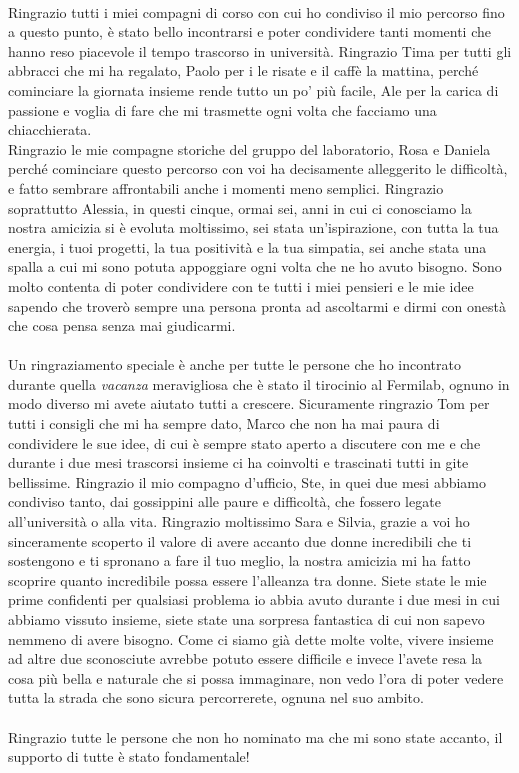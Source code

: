 \paragraph{}
Ringrazio tutti i miei compagni di corso con cui ho condiviso il mio percorso fino a questo punto, è stato bello incontrarsi e poter condividere tanti momenti che hanno reso piacevole il tempo trascorso in università.
Ringrazio Tima per tutti gli abbracci che mi ha regalato, Paolo per i le risate e il caffè la mattina, perché cominciare la giornata insieme rende tutto un po' più facile, Ale per la carica di passione e voglia di fare che mi trasmette ogni volta che facciamo una chiacchierata.\\
Ringrazio le mie compagne storiche del gruppo del laboratorio, Rosa e Daniela perché cominciare questo percorso con voi ha decisamente alleggerito le difficoltà, e fatto sembrare affrontabili anche i momenti meno semplici. 
Ringrazio soprattutto Alessia, in questi cinque, ormai sei, anni in cui ci conosciamo la nostra amicizia si è evoluta moltissimo, sei stata un'ispirazione, con tutta la tua energia, i tuoi progetti, la tua positività e la tua simpatia, sei anche stata una spalla a cui mi sono potuta appoggiare ogni volta che ne ho avuto bisogno.
Sono molto contenta di poter condividere con te tutti i miei pensieri e le mie idee sapendo che troverò sempre una persona pronta ad ascoltarmi e dirmi con onestà che cosa pensa senza mai giudicarmi.
\paragraph{}
Un ringraziamento speciale è anche per tutte le persone che ho incontrato durante quella \textit{vacanza} meravigliosa che è stato il tirocinio al Fermilab, ognuno in modo diverso mi avete aiutato tutti a crescere.
Sicuramente ringrazio Tom per tutti i consigli che mi ha sempre dato, Marco che non ha mai paura di condividere le sue idee, di cui è sempre stato aperto a discutere con me e che durante i due mesi trascorsi insieme ci ha coinvolti e trascinati tutti in gite bellissime.
Ringrazio il mio compagno d'ufficio, Ste, in quei due mesi abbiamo condiviso tanto, dai gossippini alle paure e difficoltà, che fossero legate all'università o alla vita. 
Ringrazio moltissimo Sara e Silvia, grazie a voi ho sinceramente scoperto il valore di avere accanto due donne incredibili che ti sostengono e ti spronano a fare il tuo meglio, la nostra amicizia mi ha fatto scoprire quanto incredibile possa essere l'alleanza tra donne. 
Siete state le mie prime confidenti per qualsiasi problema io abbia avuto durante i due mesi in cui abbiamo vissuto insieme, siete state una sorpresa fantastica di cui non sapevo nemmeno di avere bisogno.
Come ci siamo già dette molte volte, vivere insieme ad altre due sconosciute avrebbe potuto essere difficile e invece l'avete resa la cosa più bella e naturale che si possa immaginare, non vedo l'ora di poter vedere tutta la strada che sono sicura percorrerete, ognuna nel suo ambito.
\paragraph{}
Ringrazio tutte le persone che non ho nominato ma che mi sono state accanto, il supporto di tutte è stato fondamentale!

